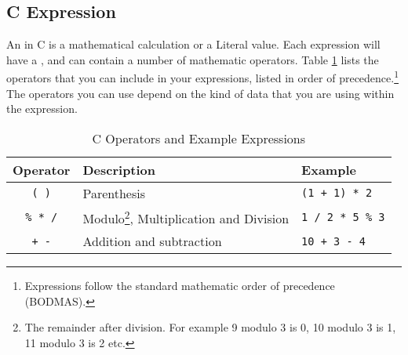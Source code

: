 \clearpage
\subsection{C Expression} %
\label{sub:program-creation-c_expression}

An  in C is a mathematical calculation or a Literal value. Each expression will have a , and can contain a number of mathematic operators. Table \ref{tbl:program-creation-c operators and expresions} lists the operators that you can include in your expressions, listed in order of precedence.\footnote{Expressions follow the standard mathematic order of precedence (BODMAS).} The operators you can use depend on the kind of data that you are using within the expression.

\begin{table}[h]
  \begin{minipage}{\textwidth}
  \centering
  \begin{tabular}{|c|l|l|}
    \hline
    \textbf{Operator} & \textbf{Description} & \textbf{Example} \\
    \hline
    \texttt{ ( ) }     &   Parenthesis                 & \texttt{(1 + 1) * 2}  \\
    \texttt{\% * /}      &   Modulo\footnote{The remainder after division. For example 9 modulo 3 is 0, 10 modulo 3 is 1, 11 modulo 3 is 2 etc.}, Multiplication and Division & \texttt{1 / 2 * 5 \% 3}    \\
    \texttt{+ -}      &   Addition and subtraction    & \texttt{10 + 3 - 4}   \\
    \hline
  \end{tabular}
  \end{minipage}
  \caption{C Operators and Example Expressions}
  \label{tbl:program-creation-c operators and expresions}
\end{table}

